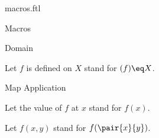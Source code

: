 \documentclass{naproche-library}
\begin{document}
\begin{smodule}{macros.ftl}
\begin{sfragment}{Macros}
\begin{sfragment}{Domain}
\begin{forthel}
      Let $f$ is defined on $X$ stand for $\dom(f)\eq X$.
    \end{forthel}
  \end{sfragment}

  \begin{sfragment}{Map Application}
    \begin{forthel}
      Let the value of $f$ at $x$ stand for $f(x)$.

      Let $f(x,y)$ stand for $f(\pair{x}{y})$.
    \end{forthel}
  \end{sfragment}
\end{sfragment}
\end{smodule}
\end{document}
